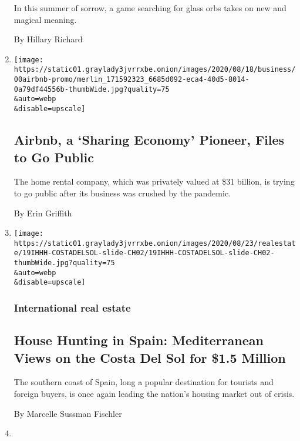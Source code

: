 \begin{enumerate}
  In this summer of sorrow, a game searching for glass orbs takes on new
  and magical meaning.

  By Hillary Richard
\item
  \href{/2020/08/19/technology/airbnb-ipo.html}{}

  \texttt{[image: https://static01.graylady3jvrrxbe.onion/images/2020/08/18/business/00airbnb-promo/merlin\_171592323\_6685d092-eca4-40d5-8014-0a79df44556b-thumbWide.jpg?quality=75\\\&auto=webp\\\&disable=upscale]}

  \hypertarget{airbnb-a-sharing-economy-pioneer-files-to-go-public}{%
  \subsection{Airbnb, a `Sharing Economy' Pioneer, Files to Go
  Public}\label{airbnb-a-sharing-economy-pioneer-files-to-go-public}}

  The home rental company, which was privately valued at \$31 billion,
  is trying to go public after its business was crushed by the pandemic.

  By Erin Griffith
\item
  \href{/2020/08/19/realestate/costa-del-sol-malaga-spain.html}{}

  \texttt{[image: https://static01.graylady3jvrrxbe.onion/images/2020/08/23/realestate/19IHHH-COSTADELSOL-slide-CH02/19IHHH-COSTADELSOL-slide-CH02-thumbWide.jpg?quality=75\\\&auto=webp\\\&disable=upscale]}

  \hypertarget{international-real-estate}{%
  \subsubsection{International real
  estate}\label{international-real-estate}}

  \hypertarget{house-hunting-in-spain-mediterranean-views-on-the-costa-del-sol-for-15-million}{%
  \subsection{House Hunting in Spain: Mediterranean Views on the Costa
  Del Sol for \$1.5
  Million}\label{house-hunting-in-spain-mediterranean-views-on-the-costa-del-sol-for-15-million}}

  The southern coast of Spain, long a popular destination for tourists
  and foreign buyers, is once again leading the nation's housing market
  out of crisis.

  By Marcelle Sussman Fischler
\item
  \href{/2020/08/14/world/americas/eusebio-leal-spengler-who-restored-old-havana-dies-at-77.html}{}


\end{enumerate}
